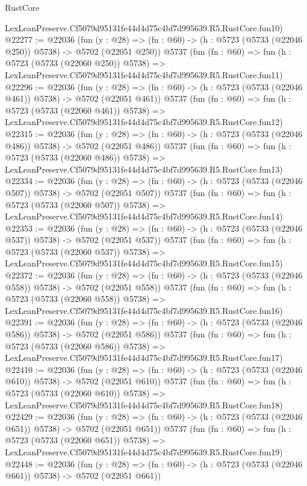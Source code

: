 \begin{lexlean}{RustCore}
\begin{coremodule}
    LexLeanPreserve.Cf5079d95131fe44d4d75c4bf7d995639.R5.RustCore.fun10)
@22277 := @22036
    (fun (y : @28) => (fn : @60) -> (h : @5723 (@5733 (@22046 @250)) @5738) -> @5702 (@22051 @250))
    @5737
    (fun (fn : @60) =>
    fun (h : @5723 (@5733 (@22060 @250)) @5738) =>
    LexLeanPreserve.Cf5079d95131fe44d4d75c4bf7d995639.R5.RustCore.fun11)
@22296 := @22036
    (fun (y : @28) => (fn : @60) -> (h : @5723 (@5733 (@22046 @461)) @5738) -> @5702 (@22051 @461))
    @5737
    (fun (fn : @60) =>
    fun (h : @5723 (@5733 (@22060 @461)) @5738) =>
    LexLeanPreserve.Cf5079d95131fe44d4d75c4bf7d995639.R5.RustCore.fun12)
@22315 := @22036
    (fun (y : @28) => (fn : @60) -> (h : @5723 (@5733 (@22046 @486)) @5738) -> @5702 (@22051 @486))
    @5737
    (fun (fn : @60) =>
    fun (h : @5723 (@5733 (@22060 @486)) @5738) =>
    LexLeanPreserve.Cf5079d95131fe44d4d75c4bf7d995639.R5.RustCore.fun13)
@22334 := @22036
    (fun (y : @28) => (fn : @60) -> (h : @5723 (@5733 (@22046 @507)) @5738) -> @5702 (@22051 @507))
    @5737
    (fun (fn : @60) =>
    fun (h : @5723 (@5733 (@22060 @507)) @5738) =>
    LexLeanPreserve.Cf5079d95131fe44d4d75c4bf7d995639.R5.RustCore.fun14)
@22353 := @22036
    (fun (y : @28) => (fn : @60) -> (h : @5723 (@5733 (@22046 @537)) @5738) -> @5702 (@22051 @537))
    @5737
    (fun (fn : @60) =>
    fun (h : @5723 (@5733 (@22060 @537)) @5738) =>
    LexLeanPreserve.Cf5079d95131fe44d4d75c4bf7d995639.R5.RustCore.fun15)
@22372 := @22036
    (fun (y : @28) => (fn : @60) -> (h : @5723 (@5733 (@22046 @558)) @5738) -> @5702 (@22051 @558))
    @5737
    (fun (fn : @60) =>
    fun (h : @5723 (@5733 (@22060 @558)) @5738) =>
    LexLeanPreserve.Cf5079d95131fe44d4d75c4bf7d995639.R5.RustCore.fun16)
@22391 := @22036
    (fun (y : @28) => (fn : @60) -> (h : @5723 (@5733 (@22046 @586)) @5738) -> @5702 (@22051 @586))
    @5737
    (fun (fn : @60) =>
    fun (h : @5723 (@5733 (@22060 @586)) @5738) =>
    LexLeanPreserve.Cf5079d95131fe44d4d75c4bf7d995639.R5.RustCore.fun17)
@22410 := @22036
    (fun (y : @28) => (fn : @60) -> (h : @5723 (@5733 (@22046 @610)) @5738) -> @5702 (@22051 @610))
    @5737
    (fun (fn : @60) =>
    fun (h : @5723 (@5733 (@22060 @610)) @5738) =>
    LexLeanPreserve.Cf5079d95131fe44d4d75c4bf7d995639.R5.RustCore.fun18)
@22429 := @22036
    (fun (y : @28) => (fn : @60) -> (h : @5723 (@5733 (@22046 @651)) @5738) -> @5702 (@22051 @651))
    @5737
    (fun (fn : @60) =>
    fun (h : @5723 (@5733 (@22060 @651)) @5738) =>
    LexLeanPreserve.Cf5079d95131fe44d4d75c4bf7d995639.R5.RustCore.fun19)
@22448 := @22036
    (fun (y : @28) => (fn : @60) -> (h : @5723 (@5733 (@22046 @661)) @5738) -> @5702 (@22051 @661))

\end{coremodule}
\end{lexlean}
